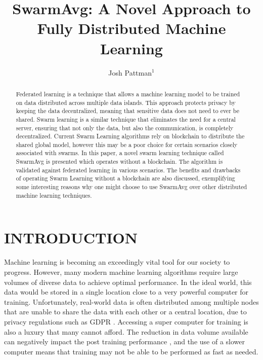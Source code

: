 \documentclass[letterpaper, 10 pt, conference]{ieeeconf}  %
\title{\LARGE \bf SwarmAvg: A Novel Approach to Fully Distributed Machine Learning}
\author{Josh Pattman$^{1}$%
}
\begin{document}
\maketitle
\thispagestyle{empty}
\pagestyle{empty}


\begin{abstract}

Federated learning is a technique that allows a machine learning model to be trained on data distributed across multiple data islands. This approach protects privacy by keeping the data decentralized, meaning that sensitive data does not need to ever be shared. Swarm learning is a similar technique that eliminates the need for a central server, ensuring that not only the data, but also the communication, is completely decentralized. Current Swarm Learning algorithms rely on blockchain to distribute the shared global model, however this may be a poor choice for certain scenarios closely associated with swarms. In this paper, a novel swarm learning technique called SwarmAvg is presented which operates without a blockchain. The algorithm is validated against federated learning in various scenarios. The benefits and drawbacks of operating Swarm Learning without a blockchain are also discussed, exemplifying some interesting reasons why one might choose to use SwarmAvg over other distributed machine learning techniques.

\end{abstract}


\section{INTRODUCTION}

Machine learning is becoming an exceedingly vital tool for our society to progress. However, many modern machine learning algorithms require large volumes of diverse data to achieve optimal performance. In the ideal world, this data would be stored in a single location close to a very powerful computer for training. Unfortunately, real-world data is often distributed among multiple nodes that are unable to share the data with each other or a central location, due to privacy regulations such as GDPR \cite{gdpr}. Accessing a super computer for training is also a luxury that many cannot afford. The reduction in data volume available can negatively impact the post training performance \cite{data_volume}, and the use of a slower computer means that training may not be able to be performed as fast as needed.
\end{document}
